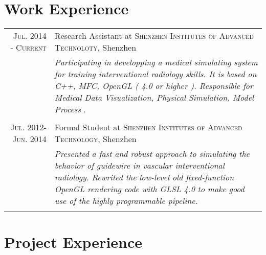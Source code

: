 \documentclass[a4paper,10pt]{article} %
\begin{document}

\section{Work Experience}

\begin{tabular}{r|p{11cm}}
\textsc{Jul. 2014 - Current} & Research Assistant at \textsc{Shenzhen Institutes of Advanced Technoloty}, Shenzhen \\
& \footnotesize{\emph{Participating in developping a medical simulating system for training interventional radiology skills. It is based on C++, MFC, OpenGL ( 4.0 or higher ). Responsible for Medical Data Visualization, Physical Simulation, Model Process }}.\\

\multicolumn{2}{c}{} \\


\textsc{Jul. 2012- Jun. 2014} & Formal Student at \textsc{Shenzhen Institutes of Advanced Technology}, Shenzhen \emph{}\\
& \footnotesize{\emph{Presented a fast and robust approach to simulating the behavior of guidewire in vascular interventional radiology. Rewrited the low-level old fixed-function OpenGL rendering code with GLSL 4.0 to make good use of the highly programmable pipeline.}}\\
\multicolumn{2}{c}{} \\


\end{tabular}



\section{Project Experience}
\end{document}
